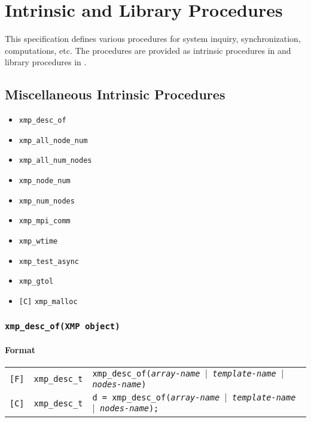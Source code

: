 \chapter{Intrinsic and Library Procedures}
\label{chap:Intrinsic and library procedures}

This specification defines various procedures for system inquiry,
synchronization, computations, etc. The procedures are provided as
intrinsic procedures in {\XMPF} and library procedures in {\XMPC}.

\section{Miscellaneous Intrinsic Procedures}

\begin{itemize}
 \item {\tt xmp\_desc\_of}
 \item {\tt xmp\_all\_node\_num}
 \item {\tt xmp\_all\_num\_nodes}
 \item {\tt xmp\_node\_num}
 \item {\tt xmp\_num\_nodes}
 \item {\tt xmp\_mpi\_comm}
 \item {\tt xmp\_wtime}
 \item {\tt xmp\_test\_async}
 \item {\tt xmp\_gtol}
 \item \verb![C]! {\tt xmp\_malloc}
\end{itemize}

\vspace{0.3cm}

\subsection{\tt xmp\_desc\_of(XMP object)}

\subsubsection*{Format}

\begin{tabular}{lll}

\verb![F]!&  {\tt xmp\_desc\_t}& {\tt xmp\_desc\_of({\it array-name} $\vert$ {\it template-name} 
$\vert$ {\it nodes-name})}\\

\verb![C]!&  {\tt xmp\_desc\_t}& {\tt *d = xmp\_desc\_of({\it array-name} $\vert$ {\it template-name} 
$\vert$ {\it nodes-name});}

\end{tabular}

